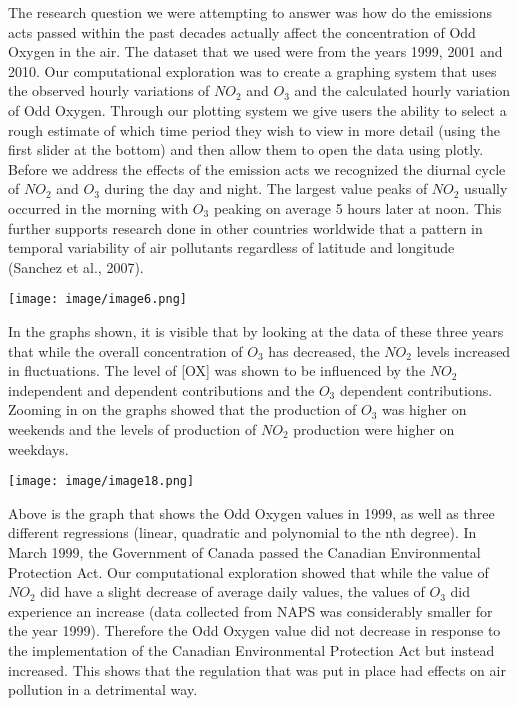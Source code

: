 \documentclass[fontsize=11pt]{article}
\begin{document}
The research question we were attempting to answer was how do the emissions acts passed within the past decades actually affect the concentration of Odd Oxygen in the air. The dataset that we used were from the years 1999, 2001 and 2010. Our computational exploration was to create a graphing system that uses the observed hourly variations of $NO_2$ and $O_3$ and the calculated hourly variation of Odd Oxygen. Through our plotting system we give users the ability to select a rough estimate of which time period they wish to view in more detail (using the first slider at the bottom) and then allow them to open the data using plotly.\\

Before we address the effects of the emission acts we recognized the diurnal cycle of $NO_2$ and $O_3$ during the day and night. The largest value peaks of $NO_2$ usually occurred  in the morning with $O_3$ peaking on average 5 hours later at noon. This further supports research done in other countries worldwide that a pattern in temporal variability of air pollutants regardless of latitude and longitude (Sanchez et al., 2007).

\begin{center}
\texttt{[image: image/image6.png]} \\
\end{center}

In the graphs shown, it is visible that by looking at the data of these three years that while the overall concentration of $O_3$ has decreased, the $NO_2$ levels increased in fluctuations. The level of [OX] was shown to be influenced by the $NO_2$ independent and dependent contributions and the $O_3$ dependent contributions. Zooming in on the graphs showed that the production of $O_3$ was higher on weekends and the levels of production of $NO_2$ production were higher on weekdays. \\

\begin{center}
\texttt{[image: image/image18.png]} \\
\end{center}

Above is the graph that shows the Odd Oxygen values in 1999, as well as three different regressions (linear, quadratic and polynomial to the nth degree). In March 1999, the Government of Canada passed the Canadian Environmental Protection Act. Our computational exploration showed that while the value of $NO_2$ did have a slight decrease of average daily values, the values of $O_3$ did experience an increase (data collected from NAPS was considerably smaller for the year 1999). Therefore the Odd Oxygen value did not decrease in response to the implementation of the Canadian Environmental Protection Act but instead increased. This shows that the regulation that was put in place had effects on air pollution in a detrimental way.\\
\end{document}
